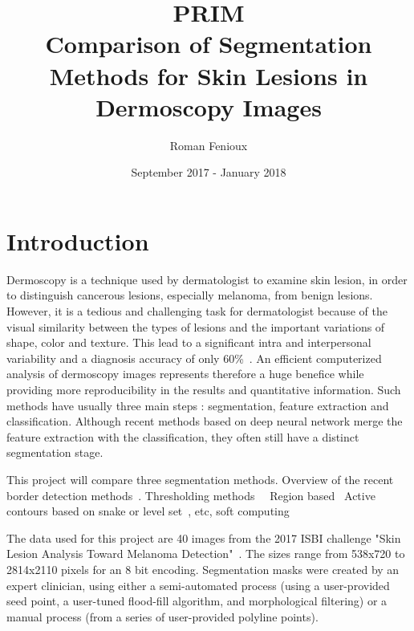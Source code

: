 \documentclass[a4paper,10pt]{article}
\title{PRIM\\ Comparison of Segmentation Methods for Skin Lesions in Dermoscopy Images}
\author{Roman Fenioux}
\date{September 2017 - January 2018}
\begin{document}
\maketitle
\newpage
\section*{Introduction}
Dermoscopy is a technique used by dermatologist to examine skin lesion, in order to distinguish cancerous lesions, especially melanoma, from benign lesions. However, it is a tedious and challenging task for dermatologist because of the visual similarity between the types of lesions and the important variations of shape, color and texture. This lead to a significant intra and interpersonal variability and a diagnosis accuracy of only 60\%~\cite{kittler_diagnostic_2002}. An efficient computerized analysis of dermoscopy images represents therefore a huge benefice while providing more reproducibility in the results and quantitative information. Such methods have usually three main steps : segmentation, feature extraction and classification. Although recent methods based on deep neural network merge the feature extraction with the classification, they often still have a distinct segmentation stage. 

This project will compare three segmentation methods. 
Overview of the recent border detection methods~\cite{celebi_lesion_2009}.
Thresholding methods~\cite{mendonca_comparison_2007}~\cite{Garnavi2010}
Region based~\cite{celebi_border_2008}
Active contours based on snake or level set~\cite{mendonca_comparison_2007}, etc, soft computing~\cite{yu_automated_2017}

The data used for this project are 40 images from the 2017 ISBI challenge "Skin Lesion Analysis Toward Melanoma Detection"~\cite{codella_skin_2017}. The sizes range from 538x720 to 2814x2110 pixels for an 8 bit encoding. Segmentation masks were created by an expert clinician, using either a semi-automated process (using a user-provided seed point, a user-tuned flood-fill algorithm, and morphological filtering) or a manual process (from a series of user-provided polyline points).


\end{document}
